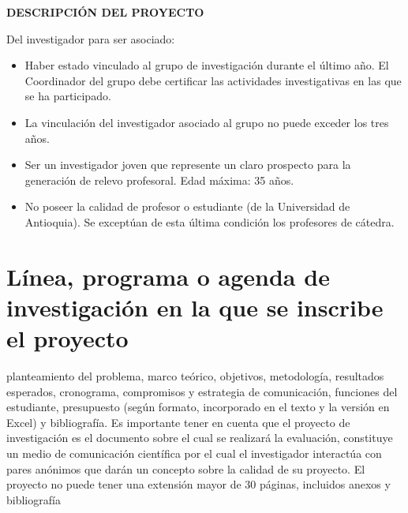 \documentclass[11pt]{article}
\begin{document}
\begin{center}
  \textbf{\large DESCRIPCIÓN DEL PROYECTO}
\end{center}

\begin{instrucciones}
  Del investigador para ser asociado:
  \begin{itemize}
  \item  Haber estado vinculado al grupo de investigación durante el último año. El Coordinador del grupo debe certificar las actividades investigativas en las que se ha participado.

  \item La vinculación del investigador asociado al grupo no puede exceder los tres años.

  \item Ser un investigador joven que represente un claro prospecto para la generación de relevo profesoral. Edad máxima: 35 años.

  \item No poseer la calidad de profesor o estudiante (de la Universidad de Antioquia). Se exceptúan de esta última condición los profesores de cátedra.
  \end{itemize}
\end{instrucciones}


\section{Línea, programa o agenda de investigación en la que se inscribe el proyecto}

\begin{instrucciones}
planteamiento del problema, marco teórico, objetivos, 
metodología, resultados esperados, cronograma, compromisos y estrategia de comunicación, funciones del 
estudiante, presupuesto (según formato, incorporado en el texto y la versión en Excel) y  bibliografía.  Es 
importante tener en cuenta que el proyecto de investigación es el documento sobre el cual se realizará la 
evaluación, constituye un medio de comunicación científica por el cual el investigador interactúa con pares 
anónimos que darán un concepto sobre la calidad de su proyecto. El proyecto no puede tener una 
extensión mayor de  30 páginas, incluidos anexos y bibliografía
\end{instrucciones}










\end{document}

